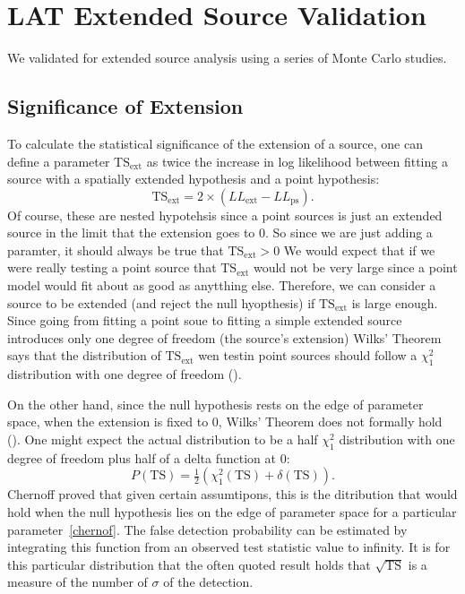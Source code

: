 \documentclass[preprint]{aastex}
\newcommand{\tsext}{{\ensuremath{\text{TS}_\text{ext}}}\xspace}
\newcommand{\ts}{\text{TS}\xspace}
\newcommand{\pointlike}{\text{\em pointlike}\xspace}
\begin{document}
\section{LAT Extended Source Validation}

We validated \pointlike for extended source
analysis using a series of Monte Carlo studies.

\subsection{Significance of Extension}

To calculate the statistical significance of the extension of a source,
one can define a parameter $\tsext$ as twice the increase in log
likelihood between fitting a source with a spatially extended hypothesis
and a point hypothesis:
\begin{equation}
  \tsext=2\times(LL_\text{ext}-LL_\text{ps}).
\end{equation}
Of course, these are nested hypotehsis since a point sources is just an
extended source in the limit that the extension goes to 0. So since we
are just adding a paramter, it should always be true that $\tsext > 0$
We would expect that if we were really testing a point source that
\tsext would not be very large since a point model would fit about
as good as anytthing else. Therefore, we can consider a source to be
extended (and reject the null hyopthesis) if \tsext is large enough.
Since going from fitting a point soue to fitting a simple extended
source introduces only one degree of freedom (the source's extension)
Wilks' Theorem says that the distribution of $\tsext$ wen testin
point sources should follow a $\chi^2_1$ distribution with one degree
of freedom (\cite{wilks_theorem}).

On the other hand, since the null hypothesis rests on the edge of
parameter space, when the extension is fixed to 0, Wilks' Theorem does
not formally hold (\cite{warn_wilks_theorem}).  One might
expect the actual distribution to be a half $\chi^2_1$ distribution with
one degree of freedom plus half of a delta function at 0:
\begin{equation}
  P(\ts)=\tfrac{1}{2}(\chi^2_1(\ts)+\delta(\ts)).
\end{equation}
Chernoff proved that given certain assumtipons, this is
the ditribution that would hold when the null hypothesis
lies on the edge of parameter space for a particular parameter~\ref{chernof}.
The false detection probability can be estimated by integrating this function 
from an observed test statistic value to infinity. It is for this
particular distribution that the often quoted result holds that
$\sqrt{\ts}$ is a measure of the number of $\sigma$ of the detection.
\end{document}
